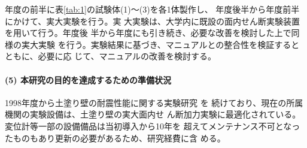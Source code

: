 \documentclass[11pt,a4paper,uplatex,dvipdfmx]{ujarticle} 		%
\newcommand{\研究課題名}{伝統的な木造土塗り壁の復元力に及ぼす軸組の影響に関する実験研究}
\newcommand{\研究機関名}{公立鳥取環境大学}
\newcommand{\研究代表者氏名}{中治弘行}
\newcommand{\私}{{\研究代表者氏名}}
\newcommand{\研究期間の最終元号年度}{8}  %
\begin{document}
年度の前半に表\ref{tab:1}の試験体(1)〜(3)を各1体製作し、
年度後半から年度前半にかけて、実大実験を行う。実
大実験は、大学内に既設の面内せん断実験装置を用いて行う。年度後
半から年度にも引き続き、必要な改善を検討した上で同様の実大実験
を行う。実験結果に基づき、マニュアルとの整合性を検証するとともに、必要に応
じて、マニュアルの改善を検討する。



\paragraph{(5) 本研究の目的を達成するための準備状況}
\mbox{}\par

1998年度から土塗り壁の耐震性能に関する実験研究
\cite{tuchikabe1999,nakajirekibo2018}を
続けており、現在の所属機関の実験設備は、土塗り壁の実大面内せ
ん断加力実験に最適化されている。変位計等一部の設備備品は当初導入から10年を
超えてメンテナンス不可となったものもあり更新の必要があるため、研究経費に含
める。\vspace{\baselineskip}

\end{document}
